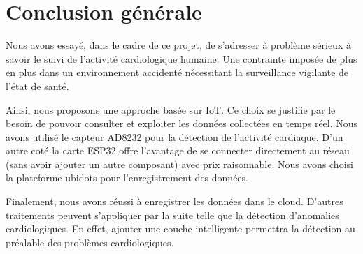 \chapter*{Conclusion générale}

Nous avons essayé, dans le cadre de ce projet, de s'adresser à problème sérieux à savoir le suivi de l'activité cardiologique humaine. Une contrainte imposée de plus en plus dans un environnement accidenté nécessitant la surveillance vigilante de l'état de santé.

Ainsi, nous proposons une approche basée sur IoT. Ce choix se justifie par le besoin de pouvoir consulter et exploiter les données collectées en temps réel. Nous avons utilisé le capteur AD8232 pour la détection de l'activité cardiaque. D'un autre coté la carte ESP32 offre l'avantage de se connecter directement au réseau (sans avoir ajouter un autre composant) avec prix raisonnable. Nous avons choisi la plateforme ubidots pour l'enregistrement des données.

Finalement, nous avons réussi à enregistrer les données dans le cloud. D'autres traitements peuvent s'appliquer par la suite telle que la détection d'anomalies cardiologiques. En effet, ajouter une couche intelligente permettra la détection au préalable des problèmes cardiologiques.

